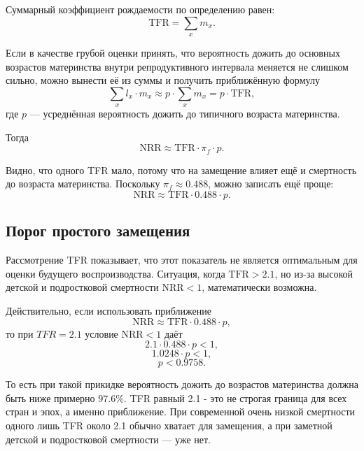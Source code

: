 \documentclass[a4paper, 14pt]{extarticle}
\begin{document}
Суммарный коэффициент рождаемости по определению равен:
\begin{equation}
\text{TFR} = \sum_{x} m_x.
\label{eq:tfr_def}
\end{equation}

Если в качестве грубой оценки принять, что вероятность дожить до основных возрастов материнства внутри репродуктивного интервала меняется не слишком сильно, можно вынести её из суммы и получить приближённую формулу
\begin{equation}
\sum_{x} l_x \cdot m_x \approx p \cdot \sum_{x} m_x = p \cdot \text{TFR},
\label{eq:approx}
\end{equation}
где $p$ --- усреднённая вероятность дожить до типичного возраста материнства.

Тогда
\begin{equation}
\text{NRR} \approx \text{TFR} \cdot \pi_f \cdot p.
\label{eq:nrr_approx}
\end{equation}

Видно, что одного TFR мало, потому что на замещение влияет ещё и смертность до возраста материнства. Поскольку $\pi_f \approx 0.488$, можно записать ещё проще:
\begin{equation}
\text{NRR} \approx \text{TFR} \cdot 0.488 \cdot p.
\label{eq:nrr_simple}
\end{equation}

\subsection{Порог простого замещения}

Рассмотрение TFR показывает, что этот показатель не является оптимальным для оценки будущего воспроизводства. Ситуация, когда $\text{TFR}>2.1$, но из-за высокой детской и подростковой смертности $\text{NRR}<1$, математически возможна.

Действительно, если использовать приближение
\[
\text{NRR} \approx \text{TFR} \cdot 0.488 \cdot p,
\]
то при $TFR=2.1$ условие $\text{NRR}<1$ даёт
\begin{equation}
2.1 \cdot 0.488 \cdot p < 1,
\label{eq:threshold1}
\end{equation}
\begin{equation}
1.0248 \cdot p < 1,
\label{eq:threshold2}
\end{equation}
\begin{equation}
p < 0.9758.
\label{eq:threshold3}
\end{equation}

То есть при такой прикидке вероятность дожить до возрастов материнства должна быть ниже примерно $97.6\%$. TFR равный 2.1 - это не строгая граница для всех стран и эпох, а именно приближение. При современной очень низкой смертности одного лишь TFR около 2.1 обычно хватает для замещения, а при заметной детской и подростковой смертности --- уже нет.
\end{document}
